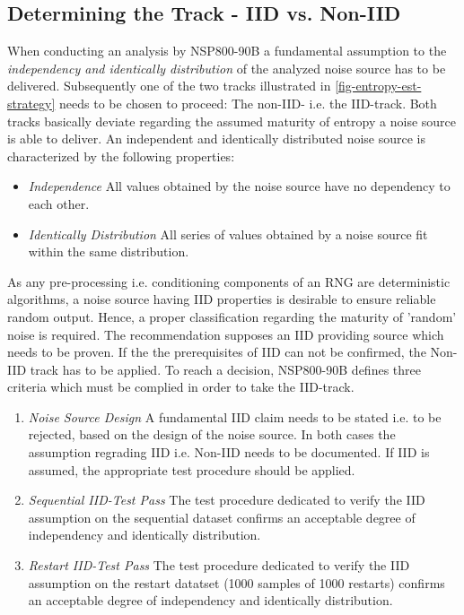 \subsection{Determining the Track - IID vs. Non-IID}\label{sub:iid-noniid-track}
When conducting an analysis by NSP800-90B a fundamental assumption to the \textit{independency and identically distribution} of the analyzed noise source has to be delivered. Subsequently one of the two tracks illustrated in \ref{fig-entropy-est-strategy} needs to be chosen to proceed: The non-IID- i.e. the IID-track. Both tracks basically deviate regarding the assumed maturity of entropy a noise source is able to deliver. An independent and identically distributed noise source is characterized by the following properties: 
\begin{itemize}
	\item \textit{Independence} All values obtained by the noise source have no dependency to each other.
		\item \textit{Identically Distribution} All series of values obtained by a noise source fit within the same distribution.
\end{itemize}
As any pre-processing i.e. conditioning components of an RNG are deterministic algorithms, a noise source having IID properties is desirable to ensure reliable random output. Hence, a proper classification regarding the maturity of 'random' noise is required. The recommendation supposes an IID providing source which needs to be proven. If the the prerequisites of IID can not be confirmed, the Non-IID track has to be applied. To reach a decision, NSP800-90B defines three criteria which must be complied in order to take the IID-track.

\begin{enumerate}
	\item \textit{Noise Source Design} A fundamental IID claim needs to be stated i.e. to be rejected, based on the design of the noise source. In both cases the assumption regrading IID i.e. Non-IID needs to be documented. If IID is assumed, the appropriate test procedure should be applied.
	\item \textit{Sequential IID-Test Pass} The test procedure dedicated to verify the IID assumption on the sequential dataset confirms an acceptable degree of independency and identically distribution.
	\item \textit{Restart IID-Test Pass} The test procedure dedicated to verify the IID assumption on the restart datatset (1000 samples of 1000 restarts) confirms an acceptable degree of independency and identically distribution.
\end{enumerate}


